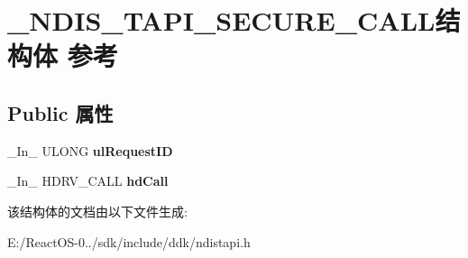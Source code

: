 \hypertarget{struct___n_d_i_s___t_a_p_i___s_e_c_u_r_e___c_a_l_l}{}\section{\+\_\+\+N\+D\+I\+S\+\_\+\+T\+A\+P\+I\+\_\+\+S\+E\+C\+U\+R\+E\+\_\+\+C\+A\+L\+L结构体 参考}
\label{struct___n_d_i_s___t_a_p_i___s_e_c_u_r_e___c_a_l_l}
\subsection*{Public 属性}
\begin{DoxyCompactItemize}
\item 
\mbox{\label{struct___n_d_i_s___t_a_p_i___s_e_c_u_r_e___c_a_l_l_af89b830d0d8b3ffb91fecbfa68ccbc70}} 
\+\_\+\+In\+\_\+ U\+L\+O\+NG {\bfseries ul\+Request\+ID}
\item 
\mbox{\label{struct___n_d_i_s___t_a_p_i___s_e_c_u_r_e___c_a_l_l_a860cb445f160ea42a3ec3468462d60bc}} 
\+\_\+\+In\+\_\+ H\+D\+R\+V\+\_\+\+C\+A\+LL {\bfseries hd\+Call}
\end{DoxyCompactItemize}


该结构体的文档由以下文件生成\+:\begin{DoxyCompactItemize}
\item 
E\+:/\+React\+O\+S-\/0../sdk/include/ddk/ndistapi.\+h\end{DoxyCompactItemize}
